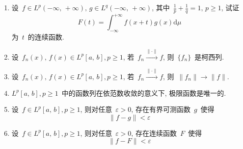 \begin{enumerate}
\item 设~$f \in L^p(-\infty,\,+\infty),\,g\in L^q(-\infty,\,+\infty)$, 其中~$\frac{1}{p}+\frac{1}{q} =1,\,p\geqslant 1$, 试证
    \[
    F(t)=\int_{-\infty}^{+\infty} f(x+t)g(x) \mathrm{d} \mu
    \]
    为~$t$~的连续函数.

\item 设~$f_{n}(x),\, f(x)\in L^p[a,\,b], p\geqslant 1$, 若~$f_{n}\xrightarrow{\mathrm{\|\cdot\|}} f$, 则~$\{f_n\}$~是柯西列.

\item 设~$f_{n}(x),\, f(x)\in L^p[a,\,b], p\geqslant 1$, 若~$f_{n}\xrightarrow{\mathrm{\|\cdot\|}} f$, 则~$\|f_n\|\rightarrow \|f\|$.

\item $L^p[a,\,b], p\geqslant 1$~中的函数列在依范数收敛的意义下, 极限函数是唯一的.

\item 设~$f\in L^p[a,\,b], p\geqslant 1$, 则对任意~$\varepsilon>0$, 存在有界可测函数~$g$~使得
\[
\|f-g\|<\varepsilon
\]

\item 设~$f\in L^p[a,\,b], p\geqslant 1$, 则对任意~$\varepsilon>0$, 存在连续函数~$F$~使得
\[
\|f-F\|<\varepsilon
\]

\end{enumerate}